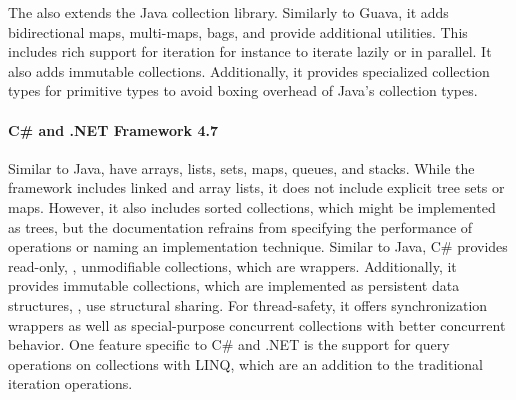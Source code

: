 \documentclass[sigconf, 10pt]{acmart}
\begin{document}

The 
also extends the Java collection library.
Similarly to Guava, it adds bidirectional maps, multi-maps, bags,
and provide additional utilities.
This includes rich support for iteration
for instance to iterate lazily or in parallel.
It also adds immutable collections.
Additionally, it provides specialized collection types for primitive types
to avoid boxing overhead of Java's collection types.


\paragraph{C\# and .NET Framework 4.7}

Similar to Java, 
have arrays, lists, sets, maps, queues, and stacks.
While the framework includes linked and array lists,
it does not include explicit tree sets or maps.
However, it also includes sorted collections,
which might be implemented as trees, but the documentation refrains from
specifying the performance of operations or naming an implementation technique.
Similar to Java, C\# provides read-only, \ie, unmodifiable collections,
which are wrappers.
Additionally, it provides immutable collections,
which are implemented as persistent data structures, \ie,
use structural sharing.
For thread-safety,
it offers synchronization wrappers
as well as special-purpose concurrent collections
with better concurrent behavior.
%
One feature specific to C\# and .NET
is the support for query operations on collections with LINQ\citep{Meijer:2011:WAL},
which are an addition to the traditional iteration operations.
\end{document}
